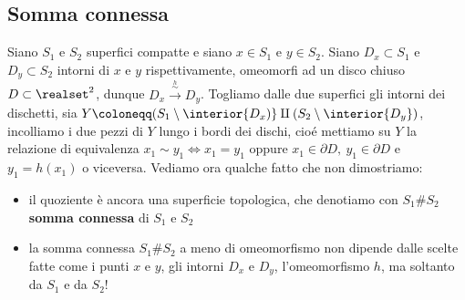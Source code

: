 	\subsection{Somma connessa}
Siano $S_1$ e $S_2$ superfici compatte e siano $x\in S_1$ e $y\in S_2$. Siano $D_x\subset S_1$ e $D_y\subset S_2$ intorni di $x$ e $y$ rispettivamente, omeomorfi ad un disco chiuso $D\subset\realset^2$, dunque $D_x\stackrel{\stackrel{h}{\sim}}{\longrightarrow} D_y$. Togliamo dalle due superfici gli intorni dei dischetti, sia $Y\coloneqq (S_1\setminus \interior{D_x)}\amalg (S_2\setminus \interior{D_y})$, incolliamo i due pezzi di $Y$ lungo i bordi dei dischi, cioé mettiamo su $Y$ la relazione di equivalenza $x_1\sim y_1 \iff x_1=y_1$ oppure $x_1\in\partial{D},\ y_1\in\partial{D}$ e $y_1=h(x_1)$ o viceversa.\newline
Vediamo ora qualche fatto che non dimostriamo:
	\begin{itemize}
		\item il quoziente è ancora una superficie topologica, che denotiamo con $S_1\# S_2$ \textbf{somma connessa} di $S_1$ e $S_2$
		\item la somma connessa $S_1\# S_2$ a meno di omeomorfismo non dipende dalle scelte fatte come i punti $x$ e $y$, gli intorni $D_x$ e $D_y$, l'omeomorfismo $h$, ma soltanto da $S_1$ e da $S_2$!
	\end{itemize}



